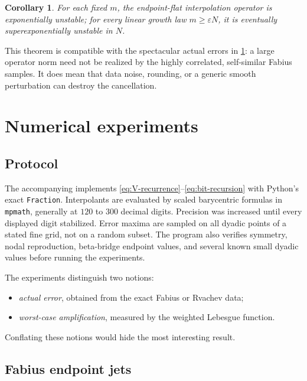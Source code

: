 \documentclass[11pt,oneside]{article}
\numberwithin{equation}{section}
\newtheorem{corollary}[theorem]{Corollary}
\theoremstyle{definition}
\theoremstyle{remark}
\begin{document}
\begin{corollary}
For each fixed $m$, the endpoint-flat interpolation operator is exponentially unstable;
for every linear growth law $m\ge\varepsilon N$, it is eventually superexponentially
unstable in $N$.
\end{corollary}

This theorem is compatible with the spectacular actual errors in
\cref{sec:numerics}: a large operator norm need not be realized by the highly correlated,
self-similar Fabius samples.  It does mean that data noise, rounding, or a generic smooth
perturbation can destroy the cancellation.

\section{Numerical experiments}
\label{sec:numerics}

\subsection{Protocol}

The accompanying  implements
\eqref{eq:V-recurrence}--\eqref{eq:bit-recursion} with Python's exact
\texttt{Fraction}.  Interpolants are evaluated by scaled barycentric formulas in
\texttt{mpmath}, generally at $120$ to $300$ decimal digits.  Precision was increased
until every displayed digit stabilized.  Error maxima are sampled on all dyadic points of
a stated fine grid, not on a random subset.  The program also verifies symmetry, nodal
reproduction, beta-bridge endpoint values, and several known small dyadic values before
running the experiments.

The experiments distinguish two notions:
\begin{itemize}
\item \emph{actual error}, obtained from the exact Fabius or Rvachev data;
\item \emph{worst-case amplification}, measured by the weighted Lebesgue function.
\end{itemize}
Conflating these notions would hide the most interesting result.

\subsection{Fabius endpoint jets}
\end{document}
